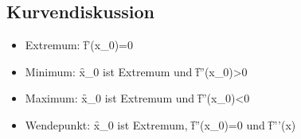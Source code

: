 \subsection{Kurvendiskussion}
\begin{itemize}
    \item Extremum: \f{f'(x_0)=0}
    \item Minimum: \f{x_0} ist Extremum und \f{f''(x_0)>0}
    \item Maximum: \f{x_0} ist Extremum und \f{f''(x_0)<0}
    \item Wendepunkt: \f{x_0} ist Extremum, \f{f''(x_0)=0} und \f{f'''(x)}
\end{itemize}